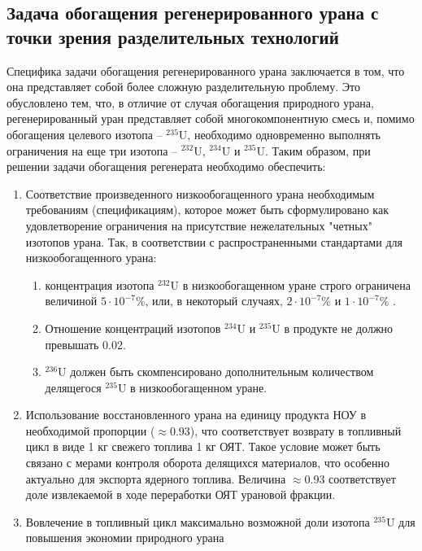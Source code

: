 \subsection{Задача обогащения регенерированного урана с точки зрения разделительных технологий}

Специфика задачи обогащения регенерированного урана заключается в том, что она представляет собой более сложную разделительную проблему.
Это обусловлено тем, что, в отличие от случая обогащения природного урана, регенерированный уран представляет собой многокомпонентную смесь и, помимо обогащения целевого изотопа -- $^{235}$U, необходимо одновременно выполнять ограничения на еще три изотопа -- $^{232}$U, $^{234}$U и $^{235}$U.
Таким образом, при решении задачи обогащения регенерата необходимо обеспечить:
\begin{enumerate}
  \item Соответствие произведенного низкообогащенного урана необходимым требованиям (спецификациям), которое может быть сформулировано как удовлетворение ограничения на присутствие нежелательных "четных" изотопов урана. Так, в соответствии с распространенными стандартами для низкообогащенного урана:
  \begin{enumerate}
    \item концентрация изотопа $^{232}$U в низкообогащенном уране строго ограничена величиной $5\cdot10^{-7}$\%, или, в некоторый случаях, $2\cdot10^{-7}$\% и $1\cdot10^{-7}$\% \cite{smirnovKaskadnyeShemyZadachah2012, c26committeeSpecificationUraniumHexafluoride}.
    \item Отношение концентраций изотопов $^{234}$U и $^{235}$U в продукте не должно превышать 0.02.
    \item $^{236}$U должен быть скомпенсировано дополнительным количеством делящегося $^{235}$U в низкообогащенном уране.
  \end{enumerate}
  \item Использование восстановленного урана на единицу продукта НОУ в необходимой пропорции ($\approx$0.93), что соответствует возврату в топливный цикл в виде 1 кг свежего топлива 1 кг ОЯТ. Такое условие может быть связано с мерами контроля оборота делящихся материалов, что особенно актуально для экспорта ядерного топлива. Величина  $\approx$0.93 соответствует доле извлекаемой в ходе переработки ОЯТ урановой фракции.
  \item Вовлечение в топливный цикл максимально возможной доли изотопа $^{235}$U для повышения экономии природного урана
\end{enumerate}

